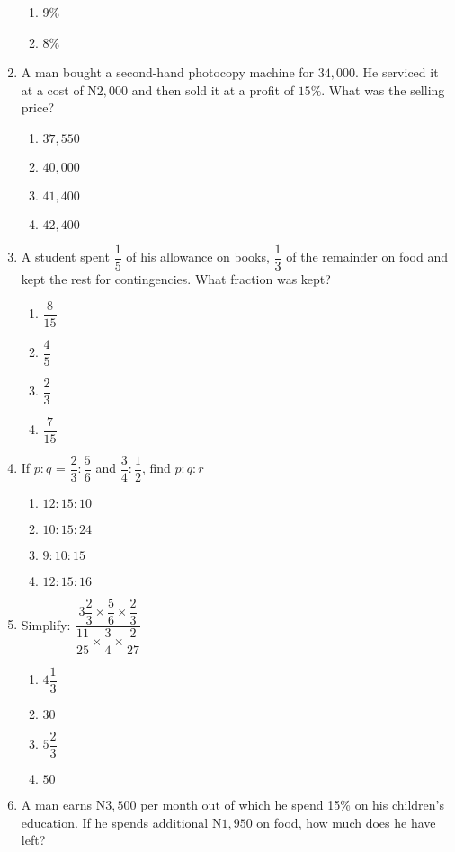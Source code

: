\begin{multicols}{2}
\begin{enumerate}[label={\arabic*.}]
\begin{enumerate}[label={\Alph*.}]
    \item \(9\)\%
    \item \(8\)\%
    \end{enumerate}
\item A man bought a second-hand photocopy machine for \(34,000\). He serviced it at a cost of N\(2,000\) and then sold it at a profit of \(15\%\). What was the selling price? 
    \begin{enumerate}[label={\Alph*.}]
    \item \(37,550\)
    \item \(40,000\)
    \item \(41,400\)
    \item \(42,400\)
    \end{enumerate}
\item A student spent \(\dfrac{1}{5}\) of his allowance on books, \(\dfrac{1}{3}\) of the remainder on food and kept the rest for contingencies. 
What fraction was kept?
    \begin{enumerate}[label={\Alph*.}]
    \item \(\dfrac{8}{15}\)
    \item \(\dfrac{4}{5}\)
    \item \(\dfrac{2}{3}\)
    \item \(\dfrac{7}{15}\)
    \end{enumerate}
\item If \(p:q\) = \(\dfrac{2}{3}:\dfrac{5}{6}\) and \(\dfrac{3}{4}:\dfrac{1}{2}\), find \(p:q:r\)
    \begin{enumerate}[label={\Alph*.}]
    \item \(12:15:10\)
    \item \(10:15:24\)
    \item \(9:10:15\)
    \item \(12:15:16\)
    \end{enumerate}
\item Simplify: \(\dfrac{3\dfrac{2}{3} \times \dfrac{5}{6} \times \dfrac{2}{3}}{\dfrac{11}{25} \times \dfrac{3}{4} \times \dfrac{2}{27}}\)
    \begin{enumerate}[label={\Alph*.}]
    \item \(4\dfrac{1}{3}\)
    \item \(30\)
    \item \(5\dfrac{2}{3}\)
    \item \(50\)
    \end{enumerate}
\item A man earns N\(3,500\) per month out of which he spend 15\% on his children's education. If he spends additional N\(1,950\) on food, how much does he have left? 

\end{enumerate}
\end{multicols}
